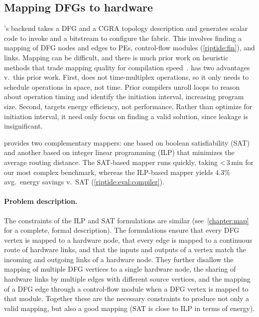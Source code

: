\subsection{Mapping DFGs to hardware}
\label{riptide:compiler:map}
\riptide's backend takes a DFG and a CGRA topology description and generates
scalar code to invoke \riptide and a bitstream to configure the \riptide fabric.
% 
This involves finding a mapping of DFG nodes and edges to PEs, control-flow modules (\autoref{riptide:fin}), and links.
% 
Mapping can be difficult, and there is much prior work on heuristic methods
that trade mapping quality for compilation speed~\cite{karunaratne2018dnestmap,hamzeh2012epimap,hamzeh2014branch,amp2020,4dcgra,himap,lee2021ultra,chordmap,pathseeker}.
% 
\riptide has two advantages v.\ this prior work.
% 
First, \riptide does not time-multiplex operations, so it only needs to schedule operations in space, not time.
%
Prior compilers unroll loops to reason about operation timing and identify the initiation interval, increasing program size.
% 
Second, \riptide targets energy efficiency, not performance.
% 
Rather than optimize for initiation interval, it need only focus on finding a valid solution, since leakage is insignificant. 

\riptide provides two complementary mappers: one based on boolean satisfiability (SAT) and another based on integer linear programming (ILP) that minimizes the average routing distance.
%
The SAT-based mapper runs quickly, taking <\,3\,min for our most complex benchmark,
whereas the ILP-based mapper yields 4.3\% avg.\ energy savings v.\ SAT (\autoref{riptide:eval:compiler}).

\paragraph{Problem description.}
The constraints of the ILP and SAT formulations are similar (see~\autoref{chapter:map} for a complete, formal description).
%
The formulations ensure that every DFG vertex is mapped to a hardware node, that every edge is mapped to a continuous route of hardware links, and that the inputs and outputs of a vertex match the incoming and outgoing links of a hardware node. 
% 
They further disallow the mapping of multiple DFG vertices to a single hardware node, the sharing of hardware links by multiple edges with different source vertices, and the mapping of a DFG edge through a control-flow module when a DFG vertex is mapped to that module.
% 
Together these are the necessary constraints to produce not only a valid mapping, but also a good mapping (SAT is close to ILP in terms of energy).
% 
% 

